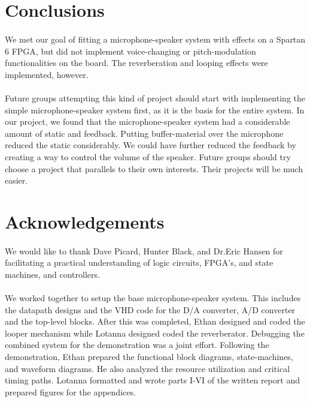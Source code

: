 \documentclass[12pt]{article}
\begin{document}
\section{Conclusions}
\paragraph{}
We met our goal of fitting a microphone-speaker system with effects on a Spartan 6 FPGA, but did not implement voice-changing or pitch-modulation functionalities on the board. The reverberation and looping effects were implemented, however. 
\paragraph{}
Future groups attempting this kind of project should start with implementing the simple microphone-speaker system first, as it is the basis for the entire system. In our project, we found that the microphone-speaker system had a considerable amount of static and feedback. Putting buffer-material over the microphone reduced the static considerably. We could have further reduced the feedback by creating a way to control the volume of the speaker. Future groups should try choose a project that parallels to their own interests. Their projects will be much easier.

\section{Acknowledgements}
\paragraph{}
We would like to thank Dave Picard, Hunter Black, and Dr.Eric Hansen for facilitating a practical understanding of logic circuits, FPGA's, and state machines, and controllers.
\paragraph{}
We worked together to setup the base microphone-speaker system. This includes the datapath designs and the VHD code for the D/A converter, A/D converter and the top-level blocks. After this was completed, Ethan designed and coded the looper mechanism while Lotanna designed coded the reverberator. Debugging the combined system for the demonstration was a joint effort. Following the demonstration, Ethan prepared the functional block diagrams, state-machines, and waveform diagrams. He also analyzed the resource utilization and critical timing paths. Lotanna formatted and wrote parts I-VI of the written report and prepared figures for the appendices.
\end{document}
